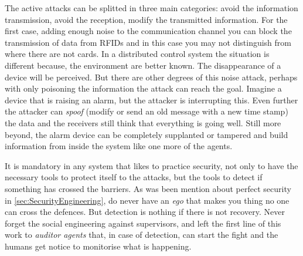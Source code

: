 \documentclass[10pt,a4paper,twoside]{llncs}
\newcommand{\ok}[1]{``#1'' [\texttt{\color{green}OK}]}
\begin{document}
The active attacks can be splitted in three main categories: avoid the information transmission, avoid the reception, modify the transmitted information. For the first case, adding enough noise to the communication channel you can block the transmission of data from RFIDs and in this case you may not distinguish from where there are not cards. In a distributed control system the situation is different because, the environment are better known. The disappearance of a device will be perceived. But there are other degrees of this noise attack, perhaps with only poisoning the information the attack can reach the goal. Imagine a device that is raising an alarm, but the attacker is interrupting this. Even further the attacker can \emph{spoof} (modify or send an old message with a new time stamp) the data and the receivers still think that everything is going well. Still more beyond, the alarm device can be completely supplanted or tampered and build information from inside the system like one more of the agents.

It is mandatory in any system that likes to practice security, not only to have the necessary tools to protect itself to the attacks, but the tools to detect if something has crossed the barriers. As was been mention about perfect security in \ref{sec:SecurityEngineering}, do never have an \emph{ego} that makes you thing no one can cross the defences. But detection is nothing if there is not recovery. Never forget the social engineering against supervisors, and left the first line of this work to \emph{auditor agents} that, in case of detection, can start the fight and the humans get notice to monitorise what is happening.

\end{document}
